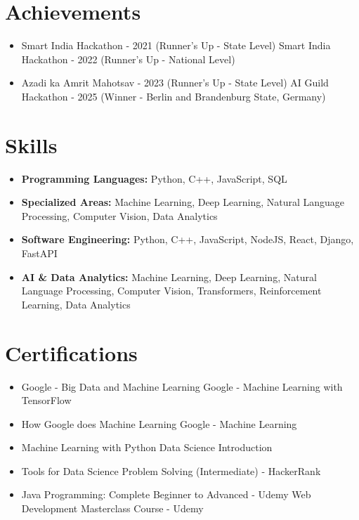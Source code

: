 \documentclass[a4paper,10pt]{article}
\begin{document}
\section*{Achievements}
\begin{itemize}
\item Smart India Hackathon - 2021 (Runner's Up - State Level) \hfill Smart India Hackathon - 2022 (Runner's Up - National Level)
\item Azadi ka Amrit Mahotsav - 2023 (Runner's Up - State Level) \hfill AI Guild Hackathon - 2025 (Winner - Berlin and Brandenburg State, Germany)
\end{itemize}

\section*{Skills}
\begin{itemize}
  \item \textbf{Programming Languages:} Python, C++, JavaScript, SQL
  \item \textbf{Specialized Areas:} Machine Learning, Deep Learning, Natural Language Processing, Computer Vision, Data Analytics
  \item \textbf{Software Engineering:} Python, C++, JavaScript, NodeJS, React, Django, FastAPI
  \item \textbf{AI \& Data Analytics:} Machine Learning, Deep Learning, Natural Language Processing, Computer Vision, Transformers, Reinforcement Learning, Data Analytics
\end{itemize}

\section*{Certifications}
\begin{itemize}
\item Google - Big Data and Machine Learning \hfill Google - Machine Learning with TensorFlow
\item How Google does Machine Learning \hfill Google - Machine Learning
\item Machine Learning with Python \hfill Data Science Introduction
\item Tools for Data Science \hfill Problem Solving (Intermediate) - HackerRank
\item Java Programming: Complete Beginner to Advanced - Udemy \hfill Web Development Masterclass Course - Udemy
\end{itemize}
\end{document}
